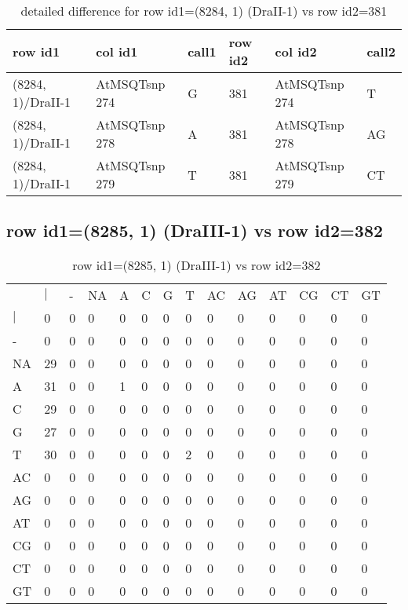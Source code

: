 \begin{center}
\begin{longtable}{|l|l|l|l|l|l|}
\caption{detailed difference for row id1=(8284, 1) (DraII-1) vs row id2=381} \label{table_dm449}\\
\hline
row id1&col id1&call1&row id2&col id2&call2\\
\hline
(8284, 1)/DraII-1&AtMSQTsnp 274&G&381&AtMSQTsnp 274&T\\
(8284, 1)/DraII-1&AtMSQTsnp 278&A&381&AtMSQTsnp 278&AG\\
(8284, 1)/DraII-1&AtMSQTsnp 279&T&381&AtMSQTsnp 279&CT\\
\hline
\end{longtable}
\end{center}

\subsection{row id1=(8285, 1) (DraIII-1) vs row id2=382}
\begin{center}
\begin{longtable}{|l|l|l|l|l|l|l|l|l|l|l|l|l|l|}
\caption{row id1=(8285, 1) (DraIII-1) vs row id2=382} \label{table_dm450}\\
\hline
\\
\hline
&$|$&-&NA&A&C&G&T&AC&AG&AT&CG&CT&GT\\
$|$&0&0&0&0&0&0&0&0&0&0&0&0&0\\
-&0&0&0&0&0&0&0&0&0&0&0&0&0\\
NA&29&0&0&0&0&0&0&0&0&0&0&0&0\\
A&31&0&0&1&0&0&0&0&0&0&0&0&0\\
C&29&0&0&0&0&0&0&0&0&0&0&0&0\\
G&27&0&0&0&0&0&0&0&0&0&0&0&0\\
T&30&0&0&0&0&0&2&0&0&0&0&0&0\\
AC&0&0&0&0&0&0&0&0&0&0&0&0&0\\
AG&0&0&0&0&0&0&0&0&0&0&0&0&0\\
AT&0&0&0&0&0&0&0&0&0&0&0&0&0\\
CG&0&0&0&0&0&0&0&0&0&0&0&0&0\\
CT&0&0&0&0&0&0&0&0&0&0&0&0&0\\
GT&0&0&0&0&0&0&0&0&0&0&0&0&0\\
\hline
\end{longtable}
\end{center}

